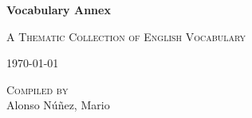 \begin{titlepage}
    \centering
    \vspace*{3cm}

    {\Huge\bfseries Vocabulary Annex\par}
    \vspace{0.5cm}
    {\Large\scshape A Thematic Collection of English Vocabulary\par}

    \vfill

    {\large \today}

    \newpage
    \thispagestyle{empty}
    \null
    \newpage

    \newpage
    \vspace*{4cm}

    {\Large\textsc{Compiled by}}\\[0.5cm]
    {\Large Alonso Núñez, Mario}

    \vfill

    \null %
\end{titlepage}